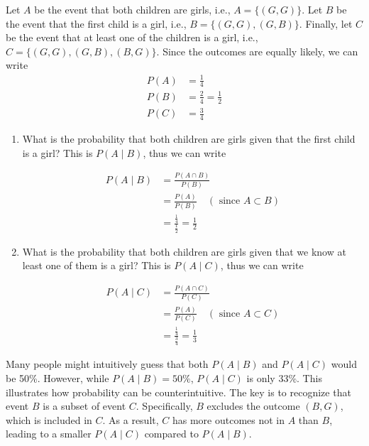\begin{solution}
    Let $A$ be the event that both children are girls, i.e., $A=\{(G, G)\}$. Let $B$ be the event that the first child is a girl, i.e., $B=\{(G, G),(G, B)\}$. Finally, let $C$ be the event that at least one of the children is a girl, i.e., $C=\{(G, G),(G, B),(B, G)\}$. Since the outcomes are equally likely, we can write
    \begin{align*}
    P(A) &= \frac{1}{4} \\
    P(B) &= \frac{2}{4} = \frac{1}{2} \\
    P(C) &= \frac{3}{4}
    \end{align*}


    \begin{enumerate}[label=(\alph*)]
         \item What is the probability that both children are girls given that the first child is a girl? This is $P(A \mid B)$, thus we can write

                    \begin{align*}
                    P(A \mid B) & =\frac{P(A \cap B)}{P(B)} \\
                    & =\frac{P(A)}{P(B)} \quad(\text { since } A \subset B) \\
                    & =\frac{\frac{1}{4}}{\frac{1}{2}}=\frac{1}{2}
                    \end{align*}
                
                \item What is the probability that both children are girls given that we know at least one of them is a girl? This is $P(A \mid C)$, thus we can write

                    \begin{align*}
                    P(A \mid C) & =\frac{P(A \cap C)}{P(C)} \\
                    & =\frac{P(A)}{P(C)} \quad(\text { since } A \subset C) \\
                    & =\frac{\frac{1}{4}}{\frac{3}{4}}=\frac{1}{3}
                    \end{align*}
        
    \end{enumerate}
\end{solution}

\begin{remark}
    Many people might intuitively guess that both \( P(A \mid B) \) and \( P(A \mid C) \) would be 50\%. However, while \( P(A \mid B) = 50\%\), \( P(A \mid C) \) is only 33\%. This illustrates how probability can be counterintuitive. The key is to recognize that event \( B \) is a subset of event \( C \). Specifically, \( B \) excludes the outcome \( (B, G) \), which is included in \( C \). As a result, \( C \) has more outcomes not in \( A \) than \( B \), leading to a smaller \( P(A \mid C) \) compared to \( P(A \mid B) \).
\end{remark}

